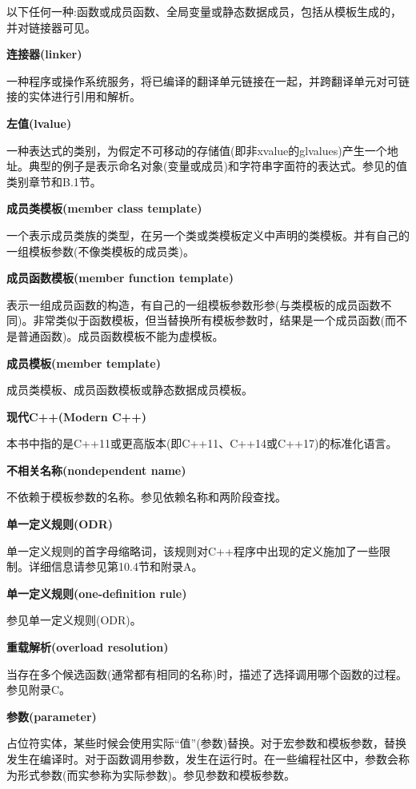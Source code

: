 以下任何一种:函数或成员函数、全局变量或静态数据成员，包括从模板生成的，并对链接器可见。

\noindent
\textbf{连接器(linker)}

一种程序或操作系统服务，将已编译的翻译单元链接在一起，并跨翻译单元对可链接的实体进行引用和解析。

\noindent
\textbf{左值(lvalue)}

一种表达式的类别，为假定不可移动的存储值(即非xvalue的glvalues)产生一个地址。典型的例子是表示命名对象(变量或成员)和字符串字面符的表达式。参见的值类别章节和B.1节。

\noindent
\textbf{成员类模板(member class template)}

一个表示成员类族的类型，在另一个类或类模板定义中声明的类模板。并有自己的一组模板参数(不像类模板的成员类)。

\noindent
\textbf{成员函数模板(member function template)}

表示一组成员函数的构造，有自己的一组模板参数形参(与类模板的成员函数不同)。非常类似于函数模板，但当替换所有模板参数时，结果是一个成员函数(而不是普通函数)。成员函数模板不能为虚模板。

\noindent
\textbf{成员模板(member template)}

成员类模板、成员函数模板或静态数据成员模板。

\noindent
\textbf{现代C++(Modern C++)}

本书中指的是C++11或更高版本(即C++11、C++14或C++17)的标准化语言。

\noindent
\textbf{不相关名称(nondependent name)}

不依赖于模板参数的名称。参见依赖名称和两阶段查找。

\noindent
\textbf{单一定义规则(ODR)}

单一定义规则的首字母缩略词，该规则对C++程序中出现的定义施加了一些限制。详细信息请参见第10.4节和附录A。

\noindent
\textbf{单一定义规则(one-definition rule)}

参见单一定义规则(ODR)。

\noindent
\textbf{重载解析(overload resolution)}

当存在多个候选函数(通常都有相同的名称)时，描述了选择调用哪个函数的过程。参见附录C。

\noindent
\textbf{参数(parameter)}

占位符实体，某些时候会使用实际“值”(参数)替换。对于宏参数和模板参数，替换发生在编译时。对于函数调用参数，发生在运行时。在一些编程社区中，参数会称为形式参数(而实参称为实际参数)。参见参数和模板参数。

